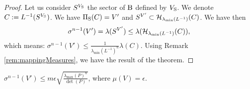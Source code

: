 \begin{proof}
Let us consider $S^{V_{\text{S}}}$ the sector of $\text{B}$ defined by $V_{\text{S}}$. We denote $C:= L^{-1}(S^{V_{\text{S}}})$. We have $\Pi_{\text{S}}(C) = V'$ and $S^{V'} \subset \mathcal{H}_{\lambda_{\min}(L^{-1})}(C)$.  We have then 
$$\sigma^{n-1}(V') = \lambda(S^{V'}) \leq \lambda (\mathcal{H}_{\lambda_{\min}(L^{-1})}(C)),$$ which means: $\sigma^{n-1}(V') \leq \frac{1}{\lambda_{\min}(L^{-1})^n} \lambda(C)$. Using Remark \ref{rem:mappingMeasures}, we have the result of the theorem.





\end{proof}

\begin{corollary}$\sigma^{n-1}(V') \leq m\epsilon \sqrt{\frac{\lambda_{\max}(P)^n}{\det(P)}}$,
where $\mu(V) = \epsilon$.
\end{corollary}


